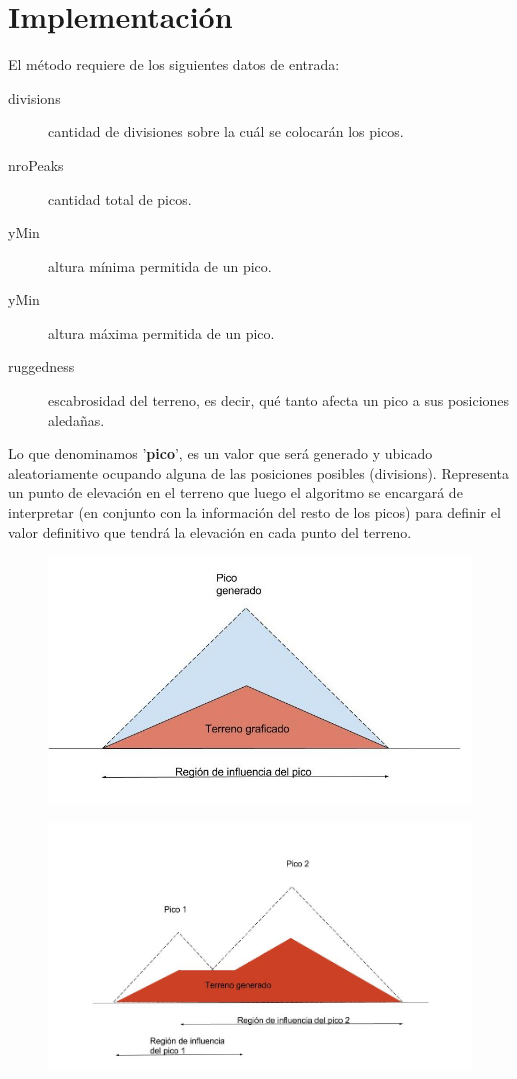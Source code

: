 \section{Implementación}

El método requiere de los siguientes datos de entrada:
\begin{description}
\item[divisions] cantidad de divisiones sobre la cuál se colocarán los picos.
\item[nroPeaks] cantidad total de picos.
\item[yMin] altura mínima permitida de un pico.
\item[yMin] altura máxima permitida de un pico.
\item[ruggedness] escabrosidad del terreno, es decir, qué tanto afecta un pico a sus posiciones aledañas.
\end{description}
\smallskip

Lo que denominamos '\textbf{pico}', es un valor que será generado y ubicado aleatoriamente ocupando alguna de las posiciones posibles (divisions). Representa un punto de elevación en el terreno que luego el algoritmo se encargará de interpretar (en conjunto con la información del resto de los picos) para definir el valor definitivo que tendrá la elevación en cada punto del terreno.
\begin{figure}[h]
\centering
\includegraphics[width=0.7\linewidth]{imagenes/Pico1}
\caption{}
\label{fig:Pico1}
\end{figure}
\begin{figure}[h]
	\centering
	\includegraphics[width=0.7\linewidth]{imagenes/pico2}
	\caption{}
	\label{fig:pico2}
\end{figure}

